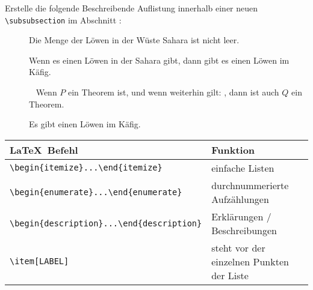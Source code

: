 \begin{frame}[fragile]
	\vspace{-0.3cm}
	\begin{Aufgabe}
		Erstelle die folgende Beschreibende Auflistung innerhalb einer neuen \lstinline[basicstyle=\normalfont\normalsize]|\subsubsection| \textrm{} im Abschnitt \textrm{}:
	\end{Aufgabe}
	\begin{outputbox}
		\vspace{-0.2cm}
		\begin{description}
			\item[{\makebox[0.5cm]{}}]
				Die Menge der Löwen in der Wüste Sahara ist nicht leer.
			\item[{\makebox[0.5cm]{}}]
				Wenn es einen Löwen in der Sahara gibt, dann gibt es einen Löwen im Käfig.
			\item[{\makebox[0.5cm]{}}]\ \newline
				Wenn $P$ ein Theorem ist, und wenn weiterhin gilt: , dann ist auch $Q$ ein Theorem.
			\item[{\makebox[0.5cm]{}}]
				Es gibt einen Löwen im Käfig.
		\end{description}
		\vspace{-0.2cm}
	\end{outputbox}
	\btVFill\Befehle
	\begin{center}
		\begin{tabular}{ll}
			\toprule
			\LaTeX\ Befehl										&	Funktion									\\ \midrule
			\lstinline|\begin{itemize}...\end{itemize}|			&	einfache Listen								\\
			\lstinline|\begin{enumerate}...\end{enumerate}|		&	durchnummerierte Aufzählungen				\\
			\lstinline|\begin{description}...\end{description}|	&	Erklärungen / Beschreibungen				\\
			\lstinline|\item[LABEL]|							&	steht vor der einzelnen Punkten der Liste	\\
			\bottomrule
		\end{tabular}
	\end{center}
	\vspace{0.1cm}
\end{frame}
